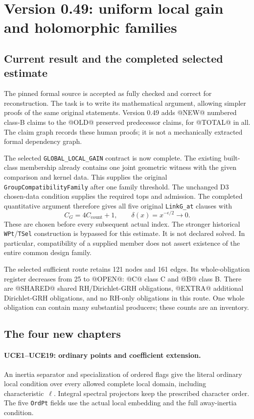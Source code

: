 \section{Version 0.49: uniform local gain and holomorphic families}
\label{sec:dependency-audit-v49}

\subsection{Current result and the completed selected estimate}

The pinned formal source is accepted as fully checked and correct for
reconstruction. The task is to write its mathematical argument,
allowing simpler proofs of the same original statements. Version 0.49
adds @NEW@ numbered class-B claims to the @OLD@ preserved predecessor
claims, for @TOTAL@ in all. The claim graph records these human proofs;
it is not a mechanically extracted formal dependency graph.

The selected \texttt{GLOBAL\_LOCAL\_GAIN} contract is now complete.
The existing built-class membership already contains one joint
geometric witness with the given comparison and kernel data. This
supplies the original \texttt{GroupCompatibilityFamily} after one
family threshold. The unchanged D3 chosen-data condition supplies
the required tops and admission. The completed quantitative argument
therefore gives all five original \texttt{LinkG\_at} clauses with
\[
 C_G=4C_{\mathrm{count}}+1,
 \qquad\delta(x)=x^{-\epsilon/2}\longrightarrow0.
\]
These are chosen before every subsequent actual index. The stronger
historical \texttt{WPt}/\texttt{TSel} construction is bypassed for
this estimate. It is not declared solved. In particular, compatibility
of a supplied member does not assert existence of the entire common
design family.

The selected sufficient route retains 121 nodes and 161 edges.
Its whole-obligation register decreases from 25 to @OPEN@:
@C@ class C and @B@ class B. There are @SHARED@ shared RH/Dirichlet-GRH
obligations, @EXTRA@ additional Dirichlet-GRH obligations, and no
RH-only obligations in this route. One whole obligation can contain
many substantial producers; these counts are an inventory.

\subsection{The four new chapters}

\paragraph{UCE1--UCE19: ordinary points and coefficient extension.}
An inertia separator and specialization of ordered flags give the
literal ordinary local condition over every allowed complete local
domain, including characteristic~\(\ell\). Integral spectral
projectors keep the prescribed character order. The five
\texttt{OrdPt} fields use the actual local embedding and the full
away-inertia condition.

